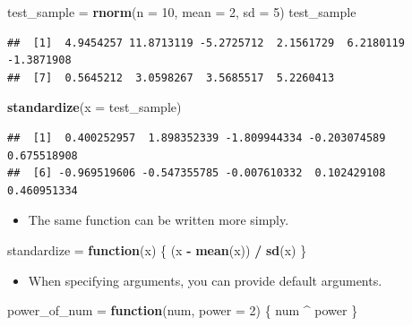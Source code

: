 \documentclass[]{book}
\newenvironment{Shaded}{\begin{snugshade}}{\end{snugshade}}
\newcommand{\KeywordTok}[1]{\textcolor[rgb]{0.13,0.29,0.53}{\textbf{#1}}}
\newcommand{\DataTypeTok}[1]{\textcolor[rgb]{0.13,0.29,0.53}{#1}}
\newcommand{\DecValTok}[1]{\textcolor[rgb]{0.00,0.00,0.81}{#1}}
\newcommand{\StringTok}[1]{\textcolor[rgb]{0.31,0.60,0.02}{#1}}
\newcommand{\ControlFlowTok}[1]{\textcolor[rgb]{0.13,0.29,0.53}{\textbf{#1}}}
\newcommand{\OperatorTok}[1]{\textcolor[rgb]{0.81,0.36,0.00}{\textbf{#1}}}
\newcommand{\NormalTok}[1]{#1}
\providecommand{\tightlist}{%
  \setlength{\itemsep}{0pt}\setlength{\parskip}{0pt}}
\begin{document}
\begin{Shaded}
\begin{Highlighting}[]
\NormalTok{test_sample =}\StringTok{ }\KeywordTok{rnorm}\NormalTok{(}\DataTypeTok{n =} \DecValTok{10}\NormalTok{, }\DataTypeTok{mean =} \DecValTok{2}\NormalTok{, }\DataTypeTok{sd =} \DecValTok{5}\NormalTok{)}
\NormalTok{test_sample}
\end{Highlighting}
\end{Shaded}

\begin{verbatim}
##  [1]  4.9454257 11.8713119 -5.2725712  2.1561729  6.2180119 -1.3871908
##  [7]  0.5645212  3.0598267  3.5685517  5.2260413
\end{verbatim}

\begin{Shaded}
\begin{Highlighting}[]
\KeywordTok{standardize}\NormalTok{(}\DataTypeTok{x =}\NormalTok{ test_sample)}
\end{Highlighting}
\end{Shaded}

\begin{verbatim}
##  [1]  0.400252957  1.898352339 -1.809944334 -0.203074589  0.675518908
##  [6] -0.969519606 -0.547355785 -0.007610332  0.102429108  0.460951334
\end{verbatim}

\begin{itemize}
\tightlist
\item
  The same function can be written more simply.
\end{itemize}

\begin{Shaded}
\begin{Highlighting}[]
\NormalTok{standardize =}\StringTok{ }\ControlFlowTok{function}\NormalTok{(x) \{}
\NormalTok{  (x }\OperatorTok{-}\StringTok{ }\KeywordTok{mean}\NormalTok{(x)) }\OperatorTok{/}\StringTok{ }\KeywordTok{sd}\NormalTok{(x)}
\NormalTok{\}}
\end{Highlighting}
\end{Shaded}

\begin{itemize}
\tightlist
\item
  When specifying arguments, you can provide default arguments.
\end{itemize}

\begin{Shaded}
\begin{Highlighting}[]
\NormalTok{power_of_num =}\StringTok{ }\ControlFlowTok{function}\NormalTok{(num, }\DataTypeTok{power =} \DecValTok{2}\NormalTok{) \{}
\NormalTok{  num }\OperatorTok{^}\StringTok{ }\NormalTok{power}
\NormalTok{\}}
\end{Highlighting}
\end{Shaded}
\end{document}
